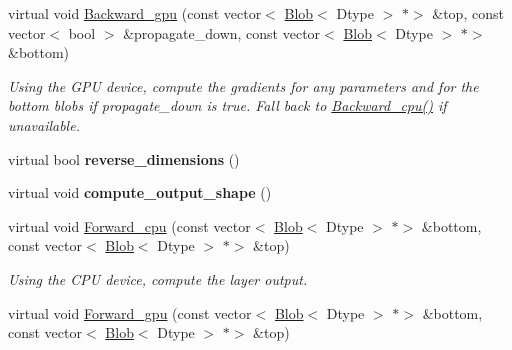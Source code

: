\begin{DoxyCompactItemize}
\mbox{\label{classcaffe_1_1_convolution_layer_a2584d7e32e5bb3a9f959aed8e5086575}} 
virtual void \mbox{\hyperlink{classcaffe_1_1_convolution_layer_a2584d7e32e5bb3a9f959aed8e5086575}{Backward\+\_\+gpu}} (const vector$<$ \mbox{\hyperlink{classcaffe_1_1_blob}{Blob}}$<$ Dtype $>$ $\ast$$>$ \&top, const vector$<$ bool $>$ \&propagate\+\_\+down, const vector$<$ \mbox{\hyperlink{classcaffe_1_1_blob}{Blob}}$<$ Dtype $>$ $\ast$$>$ \&bottom)
\begin{DoxyCompactList}\small\item\em Using the G\+PU device, compute the gradients for any parameters and for the bottom blobs if propagate\+\_\+down is true. Fall back to \mbox{\hyperlink{classcaffe_1_1_convolution_layer_a11279ea7bea3843a776a766b93e27e50}{Backward\+\_\+cpu()}} if unavailable. \end{DoxyCompactList}\item 
\mbox{\label{classcaffe_1_1_convolution_layer_aad2f350240e3e97220230d7b4ceb9bf7}} 
virtual bool {\bfseries reverse\+\_\+dimensions} ()
\item 
\mbox{\label{classcaffe_1_1_convolution_layer_ae6c1466c758151bf24215a06a6517cbe}} 
virtual void {\bfseries compute\+\_\+output\+\_\+shape} ()
\item 
\mbox{\label{classcaffe_1_1_convolution_layer_a50775af3d7d13356b06241bde364591d}} 
virtual void \mbox{\hyperlink{classcaffe_1_1_convolution_layer_a50775af3d7d13356b06241bde364591d}{Forward\+\_\+cpu}} (const vector$<$ \mbox{\hyperlink{classcaffe_1_1_blob}{Blob}}$<$ Dtype $>$ $\ast$$>$ \&bottom, const vector$<$ \mbox{\hyperlink{classcaffe_1_1_blob}{Blob}}$<$ Dtype $>$ $\ast$$>$ \&top)
\begin{DoxyCompactList}\small\item\em Using the C\+PU device, compute the layer output. \end{DoxyCompactList}\item 
\mbox{\label{classcaffe_1_1_convolution_layer_ae144ebb7d760ed4cfef8ec7bcb8fde22}} 
virtual void \mbox{\hyperlink{classcaffe_1_1_convolution_layer_ae144ebb7d760ed4cfef8ec7bcb8fde22}{Forward\+\_\+gpu}} (const vector$<$ \mbox{\hyperlink{classcaffe_1_1_blob}{Blob}}$<$ Dtype $>$ $\ast$$>$ \&bottom, const vector$<$ \mbox{\hyperlink{classcaffe_1_1_blob}{Blob}}$<$ Dtype $>$ $\ast$$>$ \&top)

\end{DoxyCompactItemize}
